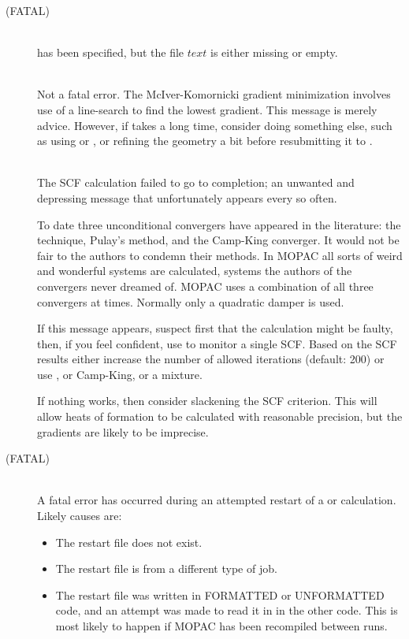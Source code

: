 \begin{description}
\item[ (FATAL)]~\\
 has been specified, but the file $text$ is
either missing or empty.

\item[]~\\
Not a fatal error.   The  McIver-Komornicki
gradient  minimization involves use of a line-search to find the lowest
gradient.  This message is merely advice.  However, if 
  takes a long time,  consider  doing
something  else,  such  as  using  or  , or refining the
geometry a bit before resubmitting it to .


\item[]~\\
The SCF calculation failed to go to  completion;  an  unwanted  and depressing
message that unfortunately appears every so often.

To  date  three  unconditional  convergers  have  appeared  in  the
literature:   the    technique,   Pulay's  method, and
the Camp-King converger.  It would not  be  fair  to  the  authors  to 
condemn  their methods.   In  MOPAC  all  sorts  of  weird  and  wonderful 
systems are calculated, systems the authors of  the  convergers  never 
dreamed  of. MOPAC  uses  a  combination  of all three convergers at times. 
Normally only a quadratic damper is used.

If this message appears, suspect first that the  calculation  might be  faulty,
then, if you feel confident, use  to monitor a single SCF. Based  on 
the  SCF  results  either  increase  the  number  of  allowed iterations
(default:  200) or use , or Camp-King, or a mixture.

If nothing works, then consider slackening the SCF criterion.  This will  
allow  heats  of  formation  to  be  calculated  with  reasonable precision,
but the gradients are likely to be imprecise.

                  
\item[ (FATAL)]~\\
A fatal error has occurred during an attempted restart of a  or 
 calculation.  Likely causes are:
\begin{itemize}
\item The restart file does not exist.
\item The restart file is from a different type of job.
\item The restart file was written in FORMATTED or UNFORMATTED code, and an
attempt was made to read it in in the other code.  This is most likely to
happen if MOPAC has been recompiled between runs.
\end{itemize}


\end{description}
